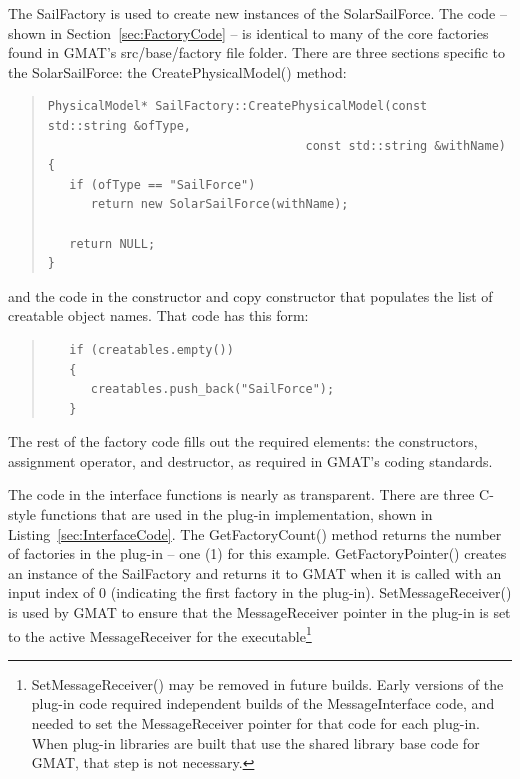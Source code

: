 \documentclass[letterpaper,10pt]{article}
\begin{document}
The SailFactory is used to create new instances of the SolarSailForce.  The code -- shown in
Section~\ref{sec:FactoryCode} -- is identical to many of the core factories found in GMAT's
src/base/factory file folder.  There are three sections specific to the SolarSailForce: the
CreatePhysicalModel() method:

\begin{quote}
\begin{verbatim}
PhysicalModel* SailFactory::CreatePhysicalModel(const std::string &ofType,
                                    const std::string &withName)
{
   if (ofType == "SailForce")
      return new SolarSailForce(withName);

   return NULL;
}
\end{verbatim}
\end{quote}

\noindent and the code in the constructor and copy constructor that populates the list of creatable
object names.  That code has this form:

\begin{quote}
\begin{verbatim}
   if (creatables.empty())
   {
      creatables.push_back("SailForce");
   }
\end{verbatim}
\end{quote}

\noindent The rest of the factory code fills out the required elements: the constructors,
assignment operator, and destructor, as required in GMAT's coding standards\cite{codeStandards}.

The code in the interface functions is nearly as transparent.  There are three C-style functions
that are used in the plug-in implementation, shown in Listing~\ref{sec:InterfaceCode}.  The
GetFactoryCount() method returns the number of factories in the plug-in -- one (1) for this
example. GetFactoryPointer() creates an instance of the SailFactory and returns it to GMAT when it
is called with an input index of 0 (indicating the first factory in the plug-in).
SetMessageReceiver() is used by GMAT to ensure that the MessageReceiver pointer in the plug-in is
set to the active MessageReceiver for the executable\footnote{SetMessageReceiver() may be removed in
future builds. Early versions of the plug-in code required independent builds of the
MessageInterface code, and needed to set the MessageReceiver pointer for that code for each plug-in.
 When plug-in libraries are built that use the shared library base code for GMAT, that step is not
necessary.}
\end{document}
